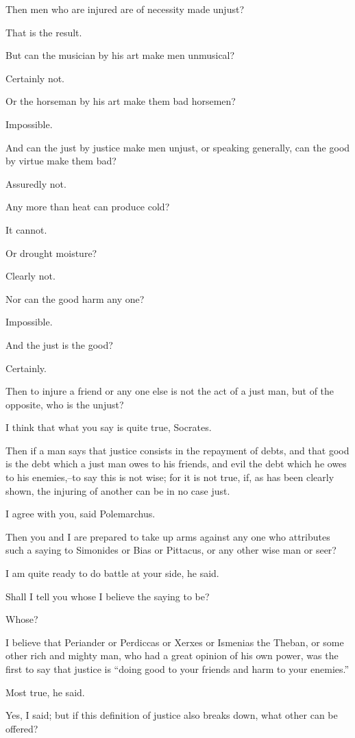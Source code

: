 Then men who are injured are of necessity made unjust?

That is the result.

But can the musician by his art make men unmusical?

Certainly not.

Or the horseman by his art make them bad horsemen?

Impossible.

And can the just by justice make men unjust, or speaking generally, can
the good by virtue make them bad?

Assuredly not.

Any more than heat can produce cold?

It cannot.

Or drought moisture?

Clearly not.

Nor can the good harm any one?

Impossible.

And the just is the good?

Certainly.

Then to injure a friend or any one else is not the act of a just man,
but of the opposite, who is the unjust?

I think that what you say is quite true, Socrates.

Then if a man says that justice consists in the repayment of debts, and
that good is the debt which a just man owes to his friends, and evil the
debt which he owes to his enemies,--to say this is not wise; for it is
not true, if, as has been clearly shown, the injuring of another can be
in no case just.

I agree with you, said Polemarchus.

Then you and I are prepared to take up arms against any one who
attributes such a saying to Simonides or Bias or Pittacus, or any other
wise man or seer?

I am quite ready to do battle at your side, he said.

Shall I tell you whose I believe the saying to be?

Whose?

I believe that Periander or Perdiccas or Xerxes or Ismenias the Theban,
or some other rich and mighty man, who had a great opinion of his own
power, was the first to say that justice is ``doing good to your friends
and harm to your enemies.''

Most true, he said.

Yes, I said; but if this definition of justice also breaks down, what
other can be offered?

